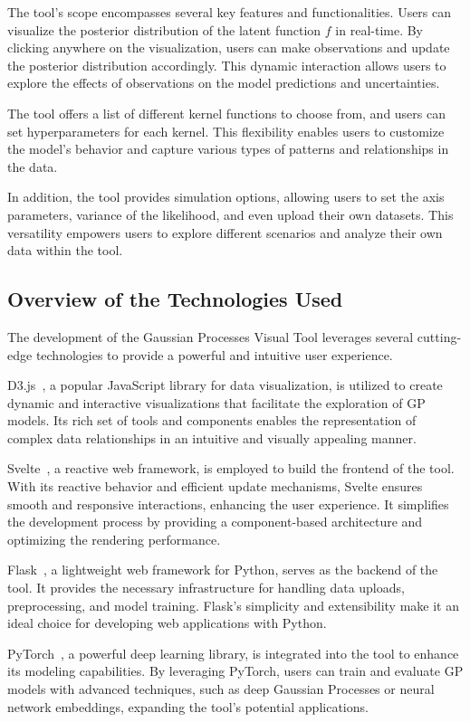 \documentclass[preprint,journal]{vgtc}       %
\begin{document}
The tool's scope encompasses several key features and functionalities. Users can visualize the posterior distribution of the latent function $f$ in real-time. By clicking anywhere on the visualization, users can make observations and update the posterior distribution accordingly. This dynamic interaction allows users to explore the effects of observations on the model predictions and uncertainties.

The tool offers a list of different kernel functions to choose from, and users can set hyperparameters for each kernel. This flexibility enables users to customize the model's behavior and capture various types of patterns and relationships in the data.

In addition, the tool provides simulation options, allowing users to set the axis parameters, variance of the likelihood, and even upload their own datasets. This versatility empowers users to explore different scenarios and analyze their own data within the tool.

\subsection{Overview of the Technologies Used}

The development of the Gaussian Processes Visual Tool leverages several cutting-edge technologies to provide a powerful and intuitive user experience.

D3.js~\cite{d3js}, a popular JavaScript library for data visualization, is utilized to create dynamic and interactive visualizations that facilitate the exploration of GP models. Its rich set of tools and components enables the representation of complex data relationships in an intuitive and visually appealing manner.

Svelte~\cite{svelte}, a reactive web framework, is employed to build the frontend of the tool. With its reactive behavior and efficient update mechanisms, Svelte ensures smooth and responsive interactions, enhancing the user experience. It simplifies the development process by providing a component-based architecture and optimizing the rendering performance.

Flask~\cite{flask}, a lightweight web framework for Python, serves as the backend of the tool. It provides the necessary infrastructure for handling data uploads, preprocessing, and model training. Flask's simplicity and extensibility make it an ideal choice for developing web applications with Python.

PyTorch~\cite{paszke2019pytorch}, a powerful deep learning library, is integrated into the tool to enhance its modeling capabilities. By leveraging PyTorch, users can train and evaluate GP models with advanced techniques, such as deep Gaussian Processes or neural network embeddings, expanding the tool's potential applications.
\end{document}

